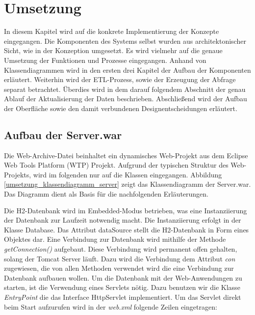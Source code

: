 

\chapter{Umsetzung}
\label{ch:umsetzung}

In diesem Kapitel wird auf die konkrete Implementierung der Konzepte eingegangen. Die Komponenten des Systems selbst wurden aus architektonischer Sicht, wie in der Konzeption umgesetzt. Es wird vielmehr auf die genaue Umsetzung der Funktionen und Prozesse eingegangen. Anhand von Klassendiagrammen wird in den ersten drei Kapitel der Aufbau der Komponenten erläutert. Weiterhin wird der ETL-Prozess, sowie der Erzeugung der Abfrage separat betrachtet. Überdies wird in dem darauf folgendem Abschnitt der genau Ablauf der Aktualisierung der Daten beschrieben. Abschließend wird der Aufbau der Oberfläche sowie den damit verbundenen Designentscheidungen erläutert. 

\section{Aufbau der Server.war}

Die Web-Archive-Datei beinhaltet ein dynamisches Web-Projekt aus dem Eclipse Web Tools Platform (WTP) Projekt. Aufgrund der typischen Struktur des Web-Projekts, wird im folgenden nur auf die Klassen eingegangen. Abbildung \ref{umsetzung_klassendiagramm_server} zeigt das Klassendiagramm der Server.war. Das Diagramm dient als Basis für die nachfolgenden Erläuterungen. 

Die H2-Datenbank wird im Embedded-Modus betrieben, was eine Instanziierung der Datenbank zur Laufzeit notwendig macht. Die Instanziierung erfolgt in der Klasse Database. Das Attribut dataSource stellt die H2-Datenbank in Form eines Objektes dar. Eine Verbindung zur Datenbank wird mithilfe der Methode \textit{getConnection()} aufgebaut. Diese Verbindung wird permanent offen gehalten, solang der Tomcat Server läuft. Dazu wird die Verbindung dem Attribut \textit{con} zugewiesen, die von allen Methoden verwendet wird die eine Verbindung zur Datenbank aufbauen wollen. Um die Datenbank mit der Web-Anwendungen zu starten, ist die Verwendung eines Servlets nötig. Dazu benutzen wir die Klasse \textit{EntryPoint} die das Interface HttpServlet implementiert. Um das Servlet direkt beim Start aufzurufen wird in der \textit{web.xml} folgende Zeilen eingetragen: 

